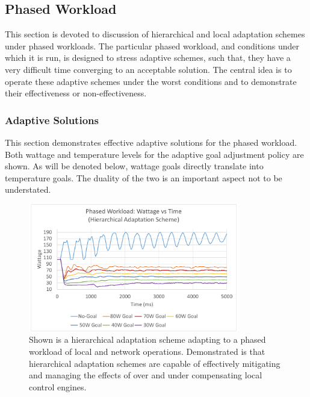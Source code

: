     \subsection{Phased Workload}
        \label{sec:phased}
        This section is devoted to discussion of hierarchical and local adaptation schemes under phased workloads. The particular phased workload, and conditions under which it is run, is designed to stress adaptive schemes, such that, they have a very difficult time converging to an acceptable solution. The central idea is to operate these adaptive schemes under the worst conditions and to demonstrate their effectiveness or non-effectiveness.
        
        \subsubsection{Adaptive Solutions}
            This section demonstrates effective adaptive solutions for the phased workload. Both wattage and temperature levels for the adaptive goal adjustment policy are shown. As will be denoted below, wattage goals directly translate into temperature goals. The duality of the two is an important aspect not to be understated. 
 
            \begin{figure}[htb!]
                \centering
                \includegraphics[width=0.82\textwidth]{Fig/phase_hier.pdf}
                \caption[Phased Workload Using an Adaptive Goal Adjustment Policy (Watts vs Time)]{Shown is a hierarchical adaptation scheme adapting to a phased workload of local and network operations. Demonstrated is that hierarchical adaptation schemes are capable of effectively mitigating and managing the effects of over and under compensating local control engines.}
                \label{fig:phase_hier}
            \end{figure}

